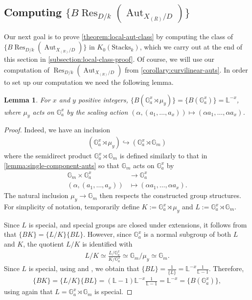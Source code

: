 \documentclass[12 pt]{amsart}
\theoremstyle{plain}
\newtheorem{lemma}[theorem]{Lemma}
\theoremstyle{definition}
\theoremstyle{remark}
\numberwithin{equation}{section}
\newcommand\bg{\mathbb G}
\newcommand\bl{\mathbb L}
\DeclareMathOperator\res{Res}
\newcommand\grStacks{K_0(\mathrm{Stacks}_k)} %
\DeclareMathOperator\aut{Aut}
\begin{document}
\subsection{Computing $\{B \res_{D/k}(\aut_{X_{(R)}/D})\}$} \label{subsection:computing-bh}

Our next goal is to prove \autoref{theorem:local-aut-class} by computing the
class of $\{B\res_{D/k}(\aut_{X_{(R)}/D})\}$ in
$\grStacks$, which we carry out at the end of this section in
\autoref{subsection:local-class-proof}.  Of course, we will use our computation of
$\res_{D/k}(\aut_{X_{(R)}/D})$ from \autoref{corollary:curvilinear-auts}.
In order to set up our computation we need the following
lemma.

\begin{lemma} \label{lemma:semidirect-class} For $x$ and $y$ positive integers,
	$\{B\left( \bg_a^x \rtimes \mu_y \right)\}= \{B(\bg_a^x)\} = \bl^{-x}$, where $\mu_y$
	acts on $\bg_a^x$ by the scaling action $(\alpha, (a_1, \ldots, a_x))
	\mapsto (\alpha a_1, \ldots, \alpha a_x)$.  \end{lemma} \begin{proof}
		Indeed, we have an inclusion \begin{align*} \left( \bg_a^x
		\rtimes \mu_{y} \right) \hookrightarrow \left( \bg_a^{x}
	\rtimes \bg_m \right) \end{align*}
	where the semidirect product $\bg_a^{x} \rtimes \bg_m$ is 
	defined similarly to that in \autoref{lemma:single-component-auts}
	so that $\bg_m$ acts on $\bg_a^{x}$ by \begin{align*} \bg_m
		\times \bg_a^x & \rightarrow \bg_a^x\\ \left( \alpha, \left(
		a_1, \ldots, a_x \right) \right) & \mapsto \left( \alpha a_1,
		\ldots, \alpha a_x \right).  \end{align*} The natural inclusion
		$\mu_{y} \rightarrow \bg_m$ then respects the constructed group
		structures.
	For simplicity of notation, temporarily define $K := \bg_a^{x} \rtimes
	\mu_{y}$ and $L :=\bg_a^{x} \rtimes \bg_m$.

	Since $L$ is special, and special groups are closed under extensions,
	it follows from \cite[Prop.\ 1.1(ix)]{Ekedahl2009} that $\{BK\} =
	\{L/K\}\{BL\}$.  However, since $\bg_a^{x}$ is a normal subgroup of both
	$L$ and $K$, the quotient $L/K$ is identified with \begin{align*} L/K
	\simeq \frac{ L/ \bg_a^{x}}{K/\bg_a^{x}} \simeq \bg_m/\mu_{y} \simeq
\bg_m.  \end{align*} Since $L$ is special, using \cite[Prop.\
1.4(i)]{Ekedahl2009} and \cite[Prop.\ 1.1(v)]{Ekedahl2009}, we obtain that
$\{BL\} = \frac{1}{\{L\}} = \bl^{-x} \frac{1}{\bl-1}$. Therefore, \begin{align*}
\{BK\} = \{L/K\}\{BL\} = (\bl-1)\bl^{-x} \frac{1}{\bl-1} = \bl^{-x} = \{B(\bg_a^x)\},
\end{align*} using again that $L = \bg_a^x \rtimes \bg_m$ is special.  \end{proof}
\end{document}

